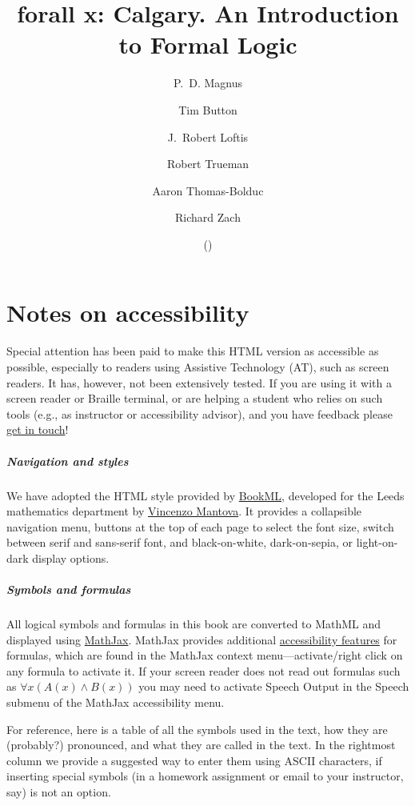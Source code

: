 \documentclass{book}
\title{forall x: Calgary. An Introduction to Formal Logic}
\author{P.~D. Magnus\and
Tim Button\and
J.~Robert Loftis\and
Robert Trueman\and
Aaron Thomas-Bolduc\and
Richard Zach}
\date{\forallxversion{} (\gitAuthorDate)}
\begin{document}


\chapter{Notes on accessibility}

Special attention has been paid to make this HTML version as
accessible as possible, especially to readers using Assistive
Technology (AT), such as screen readers. It has, however, not
been extensively tested. If you are using it with a screen reader or
Braille terminal, or are helping a student who relies on such tools
(e.g., as instructor or accessibility advisor), and you have feedback
please \href{mailto:rzach@ucalgary.ca}{get in touch}!

\paragraph{Navigation and styles} We have adopted the HTML style
provided by \href{https://vlmantova.github.io/bookml/}{BookML},
developed for the Leeds mathematics department by
\href{https://eps.leeds.ac.uk/maths/staff/4058/dr-vincenzo-l-mantova}{Vincenzo
Mantova}. It provides a collapsible navigation menu, buttons at the
top of each page to select the font size, switch between serif and
sans-serif font, and black-on-white, dark-on-sepia, or light-on-dark
display options.

\paragraph{Symbols and formulas} All logical symbols and formulas in
this book are converted to MathML and displayed using
\href{https://www.mathjax.org/}{MathJax}. MathJax provides additional
\href{https://docs.mathjax.org/en/latest/basic/accessibility.html}{accessibility
features} for formulas, which are found in the MathJax context
menu---activate/right click on any formula to activate it. If your
screen reader does not read out formulas such as $\forall x(A(x) \land
B(x))$ you may need to activate Speech Output in the Speech submenu of
the MathJax accessibility menu.

For reference, here is a table of all the symbols used in the text,
how they are (probably?) pronounced, and what they are called in the
text. In the rightmost column we provide a suggested way to enter them
using ASCII characters, if inserting special symbols (in a homework
assignment or email to your instructor, say) is not an option.
\end{document}
